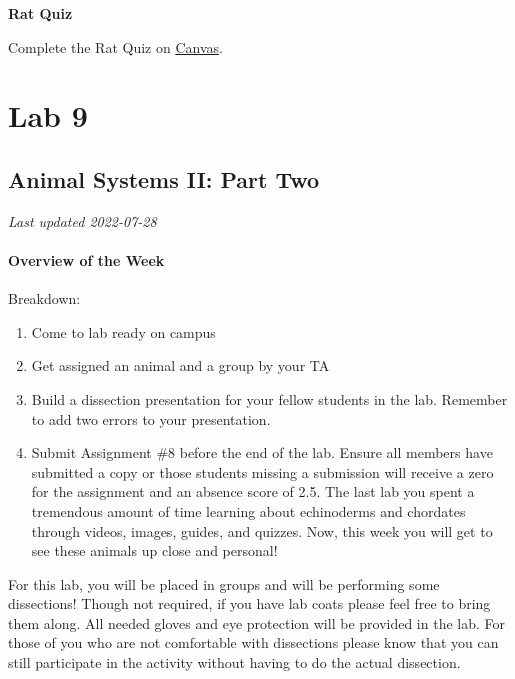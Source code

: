 \documentclass[
]{book}
\providecommand{\tightlist}{%
  \setlength{\itemsep}{0pt}\setlength{\parskip}{0pt}}
\begin{document}
\textbf{Rat Quiz}

Complete the Rat Quiz on \href{https://canvas.ubc.ca/}{Canvas}.

\hypertarget{part-lab-9}{%
\part*{Lab 9}\label{part-lab-9}}

\hypertarget{animal-systems-ii-part-two}{%
\chapter*{Animal Systems II: Part Two}\label{animal-systems-ii-part-two}}

\emph{Last updated 2022-07-28}

\hypertarget{overview-of-the-week-3}{%
\subsection*{Overview of the Week}\label{overview-of-the-week-3}}

Breakdown:

\begin{enumerate}
\def\labelenumi{\arabic{enumi}.}
\tightlist
\item
  Come to lab ready on campus
\item
  Get assigned an animal and a group by your TA
\item
  Build a dissection presentation for your fellow students in the lab. Remember to add two errors to your presentation.
\item
  Submit Assignment \#8 before the end of the lab. Ensure all members have submitted a copy or those students missing a submission will receive a zero for the assignment and an absence score of 2.5.
  The last lab you spent a tremendous amount of time learning about echinoderms and chordates through videos, images, guides, and quizzes. Now, this week you will get to see these animals up close and personal!
\end{enumerate}

For this lab, you will be placed in groups and will be performing some dissections! Though not required, if you have lab coats please feel free to bring them along. All needed gloves and eye protection will be provided in the lab. For those of you who are not comfortable with dissections please know that you can still participate in the activity without having to do the actual dissection.
\end{document}
